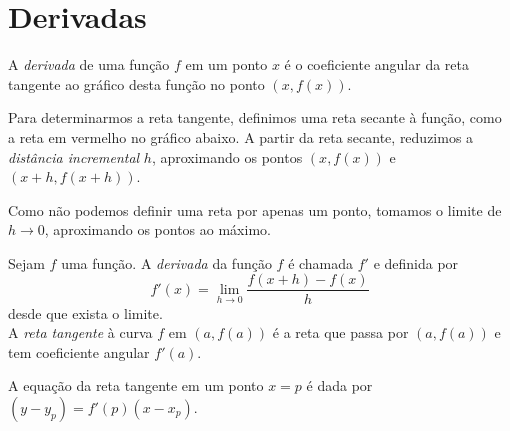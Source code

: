 \chapter{Derivadas}
A \emph{derivada} de uma função $f$ em um ponto $x$ é o coeficiente angular da reta tangente ao gráfico desta função no ponto $(x, f(x))$.\par Para determinarmos a reta tangente, definimos uma reta secante à função, como a reta em vermelho no gráfico abaixo. A partir da reta secante, reduzimos a \emph{distância incremental} $h$, aproximando os pontos $(x,f(x))$ e $(x+h,f(x+h))$. \par 
Como não podemos definir uma reta por apenas um ponto, tomamos o limite de $h \rightarrow 0$, aproximando os pontos ao máximo.

\begin{figure}[H]
	\centering
\end{figure}

\begin{df}
Sejam $f$ uma função. A \emph{derivada} da função $f$ é chamada $f'$ e definida por
\[f'(x)=\displaystyle\lim_{h\rightarrow 0}\dfrac{f(x+h)-f(x)}{h}\] desde que exista o limite. \\
A \emph{reta tangente} à curva $f$ em $(a,f(a))$ é a reta que passa por $(a,f(a))$ e tem coeficiente angular $f'(a)$.
\end{df}
A equação da reta tangente em um ponto $x=p$ é dada por $(y-y_p)=f'(p)(x-x_p)$.

